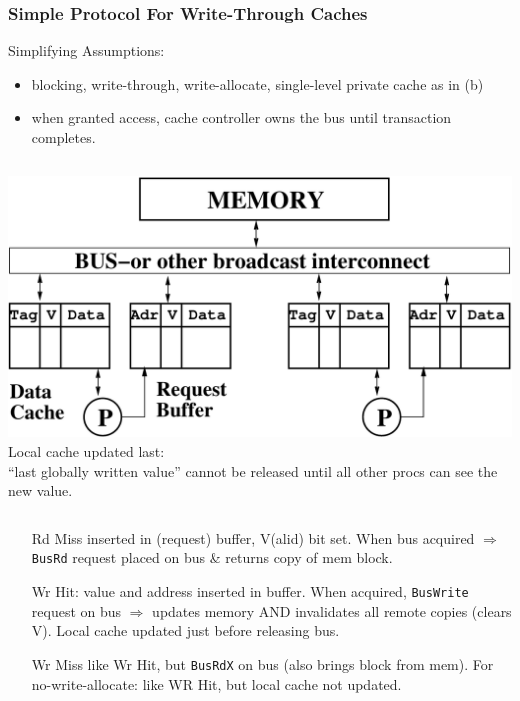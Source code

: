 \documentclass{beamer}
\newcommand{\emp}[1]{\textcolor{DikuRed}{ #1}}
\begin{document}
\begin{frame}[fragile,t]
\frametitle{Simple Protocol For Write-Through Caches}

Simplifying Assumptions:
\begin{scriptsize}
\begin{itemize}
    \item blocking, write-through, write-allocate, single-level private cache as in (b) 
    \item when granted access, cache controller owns the bus until transaction completes.
\end  {itemize}
\end {scriptsize}
\smallskip

\begin{columns}
\includegraphics[width=35ex]{FigsInfCoherence/SMPreqbuff}
\pause
Local cache updated last:\\
\emp{``last globally written value''
cannot be released until all
other procs can see the new value}.
\end{columns} 

\smallskip
\begin{itemize}
    \item[Rd Miss] inserted in (request) buffer, V(alid) bit set.
    When bus acquired $\Rightarrow$ {\tt BusRd} request placed on bus \& returns copy of mem block. 

    \item[Wr Hit:] value and address inserted in buffer. When acquired, 
    {\tt BusWrite} request on bus $\Rightarrow$ updates memory AND \alert{invalidates all
    remote copies} (clears V). \emp{Local cache updated just before releasing bus.}

    \item[Wr Miss] like Wr Hit, but {\tt BusRdX} on bus (also brings block from mem).
    For no-write-allocate: like WR Hit, but local cache not updated.

\end  {itemize}

\end{frame}
\end{document}
